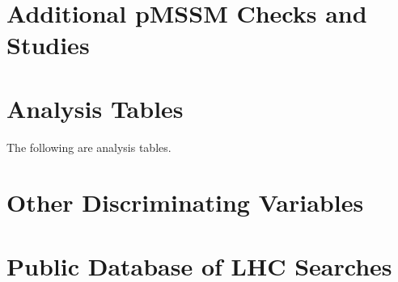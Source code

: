 \appendix
\chapter{Additional pMSSM Checks and Studies}
\label{app:pMSSMstudies}



\chapter{Analysis Tables}
\label{app:anatables}
The following are analysis tables.
%


\chapter{Other Discriminating Variables}
\label{app:discriminators}


\chapter{Public Database of LHC Searches}
\label{chap:ma5}

